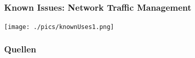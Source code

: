 \documentclass{beamer}
\begin{document}
\begin{frame}
  \frametitle{Known Issues: Network Traffic Management}
  
  \begin{center}
 \texttt{[image: ./pics/knownUses1.png]}
\end{center}
\end{frame}


\begin{frame}
 \frametitle{Quellen}

\theendnotes
 
\end{frame}
\end{document}
